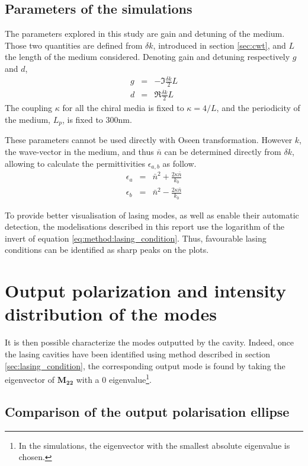\subsection{Parameters of the simulations}

The parameters explored in this study are gain and detuning of the medium. Those two quantities are defined from $\delta k$, introduced in section \ref{sec:cwt}, and $L$ the length of the medium considered. Denoting gain and detuning respectively $g$ and $d$,
\begin{eqnarray}
	g &=& - \Im{\frac{\delta k}{2}L}\\
	d &=& \Re{\frac{\delta k}{2}L}
\end{eqnarray}
%
The coupling $\kappa$ for all the chiral media is fixed to $\kappa=4/L$, and the periodicity of the medium, $L_p$, is fixed to 300nm.

These parameters cannot be used directly with Oseen transformation. However $k$, the wave-vector in the medium, and thus $\bar{n}$ can be determined directly from $\delta k$, allowing to calculate the permittivities $\epsilon_{a,b}$ as follow.
\begin{eqnarray}
\epsilon_a &=& \bar{n}^2 + \frac{2\kappa\bar{n}}{k_0}\\
\epsilon_b &=& \bar{n}^2 - \frac{2\kappa\bar{n}}{k_0}
\end{eqnarray} 

To provide better visualisation of lasing modes, as well as enable their automatic detection, the modelisations described in this report use the logarithm of the invert of equation \ref{eq:method:lasing_condition}. Thus, favourable lasing conditions can be identified as sharp peaks on the plots.



\section{Output polarization and intensity distribution of the modes}
\label{sec:output_pol}
It is then possible characterize the modes outputted by the cavity. Indeed, once the lasing cavities have been identified using method described in section \ref{sec:lasing_condition}, the corresponding output mode is found by taking the eigenvector of $\bm{M_{22}}$ with a 0 eigenvalue\footnote{In the simulations, the eigenvector with the smallest absolute eigenvalue is chosen.}.
\subsection{Comparison of the output polarisation ellipse}

